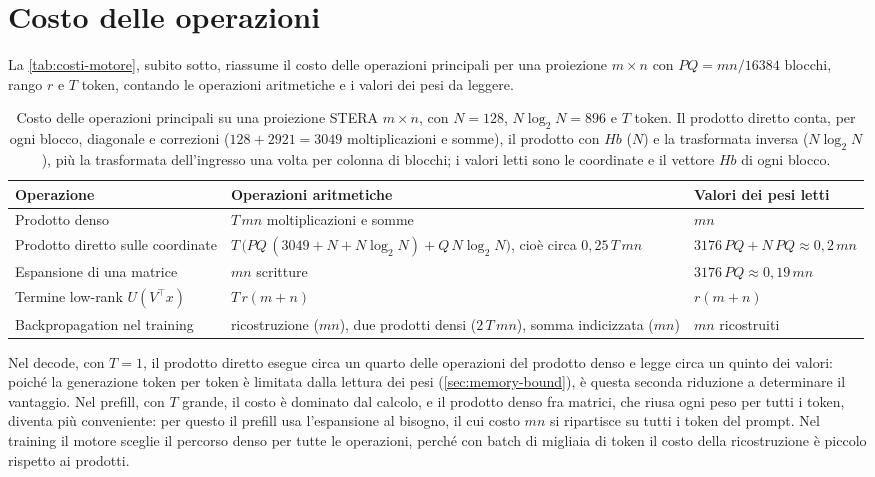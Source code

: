 \section{Costo delle operazioni}
\label{sec:costi-motore}

La \autoref{tab:costi-motore}, subito sotto, riassume il costo delle operazioni principali per una proiezione $m\times n$ con $PQ=mn/16384$ blocchi, rango $r$ e $T$ token, contando le operazioni aritmetiche e i valori dei pesi da leggere.

\begin{table}[H]
\centering
\small
\renewcommand{\arraystretch}{1.25}
\begin{tabular}{>{\raggedright\arraybackslash}p{40mm}>{\raggedright\arraybackslash}p{50mm}>{\raggedright\arraybackslash}p{38mm}}
\toprule
Operazione & Operazioni aritmetiche & Valori dei pesi letti \\
\midrule
Prodotto denso & $T\,mn$ moltiplicazioni e somme & $mn$ \\
\rowcolor{steraBlu!10} Prodotto diretto sulle coordinate & $T\,\big(PQ\,(\num{3049}+N+N\log_2N)+Q\,N\log_2N\big)$, cioè circa $0{,}25\,T\,mn$ & $\num{3176}\,PQ+N\,PQ\approx0{,}2\,mn$ \\
Espansione di una matrice & $mn$ scritture & $\num{3176}\,PQ\approx0{,}19\,mn$ \\
Termine low-rank $U(V^\top x)$ & $T\,r(m+n)$ & $r(m+n)$ \\
\rowcolor{steraArancio!12} Backpropagation nel training & ricostruzione ($mn$), due prodotti densi ($2\,T\,mn$), somma indicizzata ($mn$) & $mn$ ricostruiti \\
\bottomrule
\end{tabular}
\caption{Costo delle operazioni principali su una proiezione STERA $m\times n$, con $N=128$, $N\log_2N=896$ e $T$ token. Il prodotto diretto conta, per ogni blocco, diagonale e correzioni ($128+\num{2921}=\num{3049}$ moltiplicazioni e somme), il prodotto con $Hb$ ($N$) e la trasformata inversa ($N\log_2N$), più la trasformata dell'ingresso una volta per colonna di blocchi; i valori letti sono le coordinate e il vettore $Hb$ di ogni blocco.}
\label{tab:costi-motore}
\end{table}

Nel decode, con $T=1$, il prodotto diretto esegue circa un quarto delle operazioni del prodotto denso e legge circa un quinto dei valori: poiché la generazione token per token è limitata dalla lettura dei pesi (\autoref{sec:memory-bound}), è questa seconda riduzione a determinare il vantaggio. Nel prefill, con $T$ grande, il costo è dominato dal calcolo, e il prodotto denso fra matrici, che riusa ogni peso per tutti i token, diventa più conveniente: per questo il prefill usa l'espansione al bisogno, il cui costo $mn$ si ripartisce su tutti i token del prompt. Nel training il motore sceglie il percorso denso per tutte le operazioni, perché con batch di migliaia di token il costo della ricostruzione è piccolo rispetto ai prodotti.

